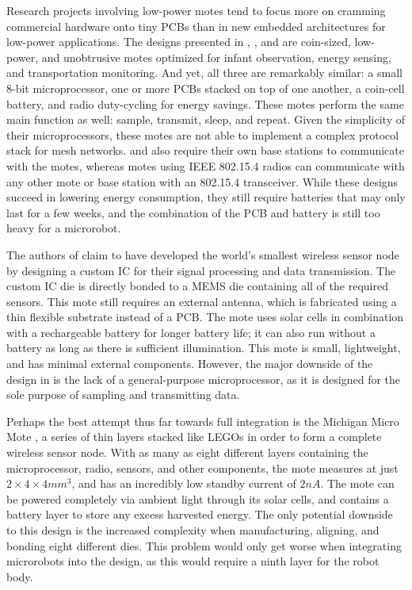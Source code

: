 Research projects involving low-power motes tend to focus more on cramming commercial hardware onto tiny PCBs than in new embedded architectures for low-power applications. The designs presented in \cite{eco}, \cite{energy}, and \cite{transportation} are coin-sized, low-power, and unobtrusive motes optimized for infant observation, energy sensing, and transportation monitoring. And yet, all three are remarkably similar: a small 8-bit microprocessor, one or more PCBs stacked on top of one another, a coin-cell battery, and radio duty-cycling for energy savings. These motes perform the same main function as well: sample, transmit, sleep, and repeat. Given the simplicity of their microprocessors, these motes are not able to implement a complex protocol stack for mesh networks. \cite{eco} and \cite{transportation} also require their own base stations to communicate with the motes, whereas motes using IEEE 802.15.4 radios can communicate with any other mote or base station with an 802.15.4 transceiver. While these designs succeed in lowering energy consumption, they still require batteries that may only last for a few weeks, and the combination of the PCB and battery is still too heavy for a microrobot.

The authors of \cite{japan} claim to have developed the world’s smallest wireless sensor node by designing a custom IC for their signal processing and data transmission. The custom IC die is directly bonded to a MEMS die containing all of the required sensors. This mote still requires an external antenna, which is fabricated using a thin flexible substrate instead of a PCB. The mote uses solar cells in combination with a rechargeable battery for longer battery life; it can also run without a battery as long as there is sufficient illumination. This mote is small, lightweight, and has minimal external components. However, the major downside of the design in \cite{japan} is the lack of a general-purpose microprocessor, as it is designed for the sole purpose of sampling and transmitting data.

Perhaps the best attempt thus far towards full integration is the Michigan Micro Mote \cite{mmm}, a series of thin layers stacked like LEGOs in order to form a complete wireless sensor node.  With as many as eight different layers containing the microprocessor, radio, sensors, and other components, the mote measures at just $2 \times 4 \times 4 mm^3$, and has an incredibly low standby current of $2nA$. The mote can be powered completely via ambient light through its solar cells, and contains a battery layer to store any excess harvested energy. The only potential downside to this design is the increased complexity when manufacturing, aligning, and bonding eight different dies. This problem would only get worse when integrating microrobots into the design, as this would require a ninth layer for the robot body.

